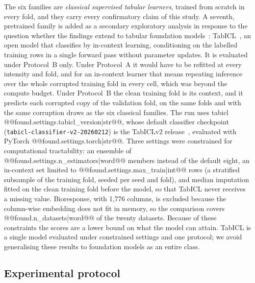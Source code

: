 \documentclass[pdflatex,sn-mathphys]{sn-jnl}
\theoremstyle{thmstyleone}
\theoremstyle{thmstyletwo}
\theoremstyle{thmstylethree}
\begin{document}
The six families are \emph{classical supervised tabular learners}, trained from scratch in every fold, and they carry every confirmatory claim of this study. A seventh, pretrained family is added as a secondary exploratory analysis in response to the question whether the findings extend to tabular foundation models~\cite{hollmann2023tabpfn}: TabICL~\cite{qu2025tabicl}, an open model that classifies by in-context learning, conditioning on the labelled training rows in a single forward pass without parameter updates. It is evaluated under Protocol~B only. Under Protocol~A it would have to be refitted at every intensity and fold, and for an in-context learner that means repeating inference over the whole corrupted training fold in every cell, which was beyond the compute budget. Under Protocol~B the clean training fold is its context, and it predicts each corrupted copy of the validation fold, on the same folds and with the same corruption draws as the six classical families. The run uses tabicl @@{found.settings.tabicl_version|str}@@, whose default classifier checkpoint (\texttt{tabicl-classifier-v2-20260212}) is the TabICLv2 release~\cite{qu2025tabicl}, evaluated with PyTorch @@{found.settings.torch|str}@@. Three settings were constrained for computational tractability: an ensemble of @@{found.settings.n_estimators|word}@@ members instead of the default eight, an in-context set limited to @@{found.settings.max_train|int}@@ rows (a stratified subsample of the training fold, seeded per seed and fold), and median imputation fitted on the clean training fold before the model, so that TabICL never receives a missing value. Bioresponse, with 1,776 columns, is excluded because the column-wise embedding does not fit in memory, so the comparison covers @@{found.n_datasets|word}@@ of the twenty datasets. Because of these constraints the scores are a lower bound on what the model can attain. TabICL is a single model evaluated under constrained settings and one protocol; we avoid generalising these results to foundation models as an entire class.

\subsection{Experimental protocol}\label{sec:method:protocol}
\end{document}
